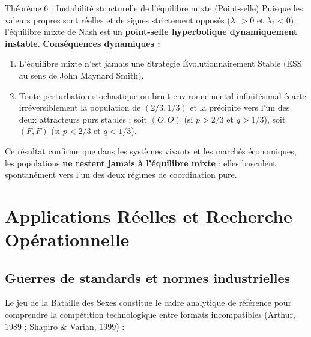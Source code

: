 \documentclass[11pt,a4paper]{article}
\begin{document}
\begin{propbox}{Théorème 6 : Instabilité structurelle de l'équilibre mixte (Point-selle)}
Puisque les valeurs propres sont réelles et de signes strictement opposés ($\lambda_1 > 0$ et $\lambda_2 < 0$), l'équilibre mixte de Nash est un \textbf{point-selle hyperbolique dynamiquement instable}.
\textbf{Conséquences dynamiques :}
\begin{enumerate}[label=(\roman*)]
    \item L'équilibre mixte n'est jamais une Stratégie Évolutionnairement Stable (ESS au sens de John Maynard Smith).
    \item Toute perturbation stochastique ou bruit environnemental infinitésimal écarte irréversiblement la population de $(2/3, 1/3)$ et la précipite vers l'un des deux attracteurs purs stables : soit $(O, O)$ (si $p > 2/3$ et $q > 1/3$), soit $(F, F)$ (si $p < 2/3$ et $q < 1/3$).
\end{enumerate}
\end{propbox}

Ce résultat confirme que dans les systèmes vivants et les marchés économiques, les populations \textbf{ne restent jamais à l'équilibre mixte} : elles basculent spontanément vers l'un des deux régimes de coordination pure.

\newpage

\section{Applications Réelles et Recherche Opérationnelle}\label{sec:applications}

\subsection{Guerres de standards et normes industrielles}
Le jeu de la Bataille des Sexes constitue le cadre analytique de référence pour comprendre la compétition technologique entre formats incompatibles (Arthur, 1989 ; Shapiro \& Varian, 1999) :
\end{document}
